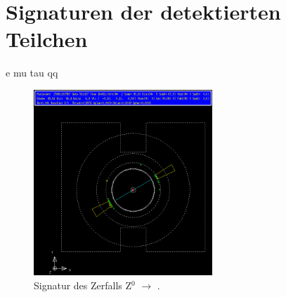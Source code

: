\section{Signaturen der detektierten Teilchen}

e
mu
tau
qq


\begin{figure}[H]
\begin{center}
  \includegraphics[width=0.6\textwidth]{../img/gropepics/ee1b.png}
  \caption{Signatur des Zerfalls Z$^0$ $\to$ \ee.}
  \label{img:label}
\end{center}
\end{figure} 
